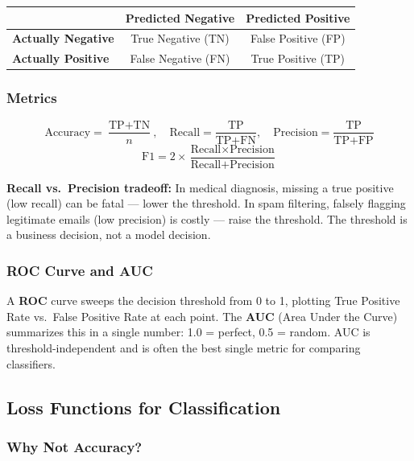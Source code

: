 \documentclass[11pt]{article}
\begin{document}
\begin{center}
\begin{tabular}{l|cc}
 & \textbf{Predicted Negative} & \textbf{Predicted Positive} \\\hline
\textbf{Actually Negative} & True Negative (TN) & False Positive (FP) \\
\textbf{Actually Positive} & False Negative (FN) & True Positive (TP) \\
\end{tabular}
\end{center}

\subsubsection{Metrics}

\[
\text{Accuracy} = \frac{\text{TP} + \text{TN}}{n}, \quad
\text{Recall} = \frac{\text{TP}}{\text{TP}+\text{FN}}, \quad
\text{Precision} = \frac{\text{TP}}{\text{TP}+\text{FP}}
\]
\[
\text{F1} = 2 \times \frac{\text{Recall} \times \text{Precision}}{\text{Recall} + \text{Precision}}
\]

\begin{notebox}
\textbf{Recall vs.\ Precision tradeoff:} In medical diagnosis, missing a true positive (low recall) can be fatal --- lower the threshold. In spam filtering, falsely flagging legitimate emails (low precision) is costly --- raise the threshold. The threshold is a business decision, not a model decision.
\end{notebox}

\subsubsection{ROC Curve and AUC}

A \textbf{ROC} curve sweeps the decision threshold from 0 to 1, plotting True Positive Rate vs.\ False Positive Rate at each point. The \textbf{AUC} (Area Under the Curve) summarizes this in a single number: 1.0 = perfect, 0.5 = random. AUC is threshold-independent and is often the best single metric for comparing classifiers.

\subsection{Loss Functions for Classification}

\subsubsection{Why Not Accuracy?}
\end{document}
